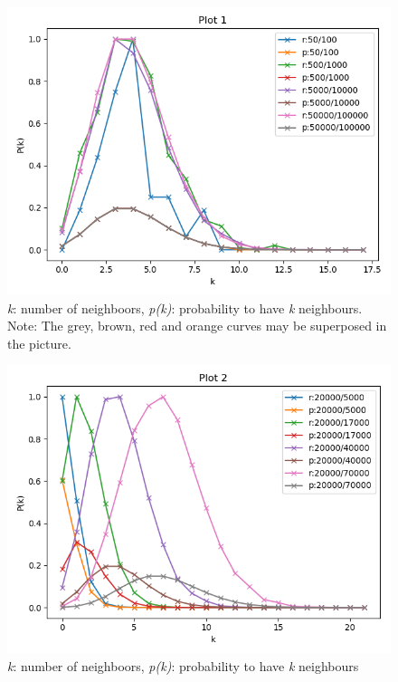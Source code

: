 \documentclass[10pt,a4paper]{article}
\begin{document}
\begin{figure}[H]
	\centering
	\includegraphics[width=0.8\linewidth]{"../Scripts/Plot 1"}
	\caption{\textit{k}: number of neighboors,  \textit{p(k)}: probability to have \textit{k} neighbours. Note: The grey, brown, red and orange curves may be superposed in the picture.}
	\label{fig:plot-1}
\end{figure}


\begin{figure}[H]
	\centering
	\includegraphics[width=0.8\linewidth]{"../Scripts/Plot 2"}
	\caption{\textit{k}: number of neighboors,  \textit{p(k)}: probability to have \textit{k} neighbours}
	\label{fig:plot-2}
\end{figure}
\end{document}
